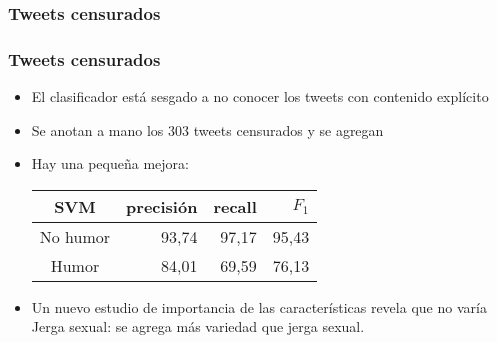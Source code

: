 \subsubsection{Tweets censurados}
\begin{frame}
    \frametitle{Tweets censurados}

    \begin{itemize}[<+->]
        \item El clasificador está sesgado a no conocer los tweets con contenido explícito
        \item Se anotan a mano los 303 tweets censurados y se agregan
        \item Hay una pequeña mejora:
        \begin{center}
            \begin{tabular}{ c | r | r | r }
                \textbf{SVM} & precisión & recall & $F_1$ \\
                \hline
                No humor & 93,74 & 97,17 & 95,43 \\
                \hline
                Humor & 84,01 & 69,59 & 76,13 \\
            \end{tabular}
        \end{center}
        \item Un nuevo estudio de importancia de las características revela que no varía Jerga sexual: se agrega más variedad que jerga sexual.
    \end{itemize}
\end{frame}

